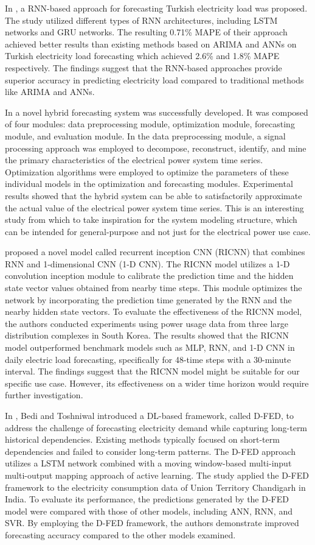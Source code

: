 In \cite{8404313}, a RNN-based approach for forecasting Turkish electricity load was proposed.
The study utilized different types of RNN architectures, including LSTM networks and GRU networks.
The resulting 0.71\% MAPE of their approach achieved better results than existing methods based on ARIMA and ANNs on Turkish electricity load forecasting which achieved 2.6\% and 1.8\% MAPE respectively.
The findings suggest that the RNN-based approaches provide superior accuracy in predicting electricity load compared to traditional methods like ARIMA and ANNs.

In \cite{DU2018533} a novel hybrid forecasting system was successfully developed.
It was composed of four modules: data preprocessing module, optimization module, forecasting module, and evaluation module.
In the data preprocessing module, a signal processing approach was employed to decompose, reconstruct, identify, and mine the primary characteristics of the electrical power system time series.
Optimization algorithms were employed to optimize the parameters of these individual models in the optimization and forecasting modules.
Experimental results showed that the hybrid system can be able to satisfactorily approximate the actual value of the electrical power system time series.
This is an interesting study from which to take inspiration for the system modeling structure, which can be intended for general-purpose and not just for the electrical power use case.

\cite{KIM2019328} proposed a novel model called recurrent inception CNN (RICNN) that combines RNN and 1-dimensional CNN (1-D CNN).
The RICNN model utilizes a 1-D convolution inception module to calibrate the prediction time and the hidden state vector values obtained from nearby time steps.
This module optimizes the network by incorporating the prediction time generated by the RNN and the nearby hidden state vectors.
To evaluate the effectiveness of the RICNN model, the authors conducted experiments using power usage data from three large distribution complexes in South Korea.
The results showed that the RICNN model outperformed benchmark models such as MLP, RNN, and 1-D CNN in daily electric load forecasting, specifically for 48-time steps with a 30-minute interval.
The findings suggest that the RICNN model might be suitable for our specific use case. However, its effectiveness on a wider time horizon would require further investigation.

In \cite{BEDI20191312}, Bedi and Toshniwal introduced a DL-based framework, called D-FED, to address the challenge of forecasting electricity demand while capturing long-term historical dependencies.
Existing methods typically focused on short-term dependencies and failed to consider long-term patterns.
The D-FED approach utilizes a LSTM network combined with a moving window-based multi-input multi-output mapping approach of active learning.
The study applied the D-FED framework to the electricity consumption data of Union Territory Chandigarh in India.
To evaluate its performance, the predictions generated by the D-FED model were compared with those of other models, including ANN, RNN, and SVR.
By employing the D-FED framework, the authors demonstrate improved forecasting accuracy compared to the other models examined.

